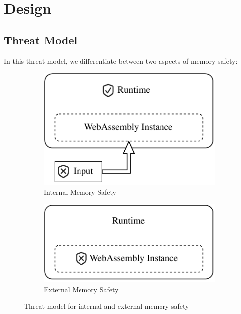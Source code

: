 \chapter{Design}
\label{ch:design}

\section{Threat Model}
\label{sec:threat-model}

In this threat model, we differentiate between two aspects of memory safety:

\begin{figure}
    \centering
    \begin{subfigure}[T]{0.45\textwidth}
        \centering
        \includegraphics{figures/build/wasm-internal-mem-safety}
        \caption{Internal Memory Safety}
        \label{fig:internal-mem-safety}
    \end{subfigure}
    \hfill
    \begin{subfigure}[T]{0.45\textwidth}
        \centering
        \includegraphics{figures/build/wasm-external-mem-safety}
        \caption{External Memory Safety}
        \label{fig:external-mem-safety}
    \end{subfigure}
    \caption{Threat model for internal and external memory safety}
    \label{fig:threat-model}
\end{figure}

